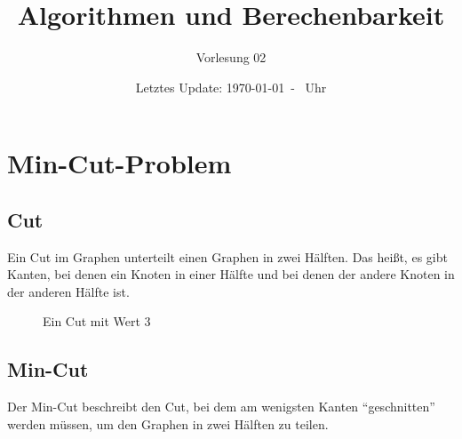 \documentclass{scrartcl}%
\begin{document}
    \subject{Vorlesungsmitschrieb}
    \title{Algorithmen und Berechenbarkeit}
    \subtitle{Vorlesung 02}
    \date{Letztes Update: \today \ - \currenttime \ Uhr}
    \maketitle

    \section*{Min-Cut-Problem}
    \label{sec:mincutproblem}

    \subsection*{Cut}
    \label{subsec:cut}

    Ein Cut im Graphen unterteilt einen Graphen in zwei Hälften.
    Das heißt, es gibt Kanten, bei denen ein Knoten in einer
    Hälfte und bei denen der andere Knoten in der anderen Hälfte ist.

    \begin{figure}[htb]
        \centering

        \caption{Ein Cut mit Wert 3}
    \end{figure}

    \subsection*{Min-Cut}
    \label{subsec:mincut}
    Der Min-Cut beschreibt den Cut, bei dem am wenigsten Kanten "`geschnitten"' werden müssen,
    um den Graphen in zwei Hälften zu teilen.
\end{document}
